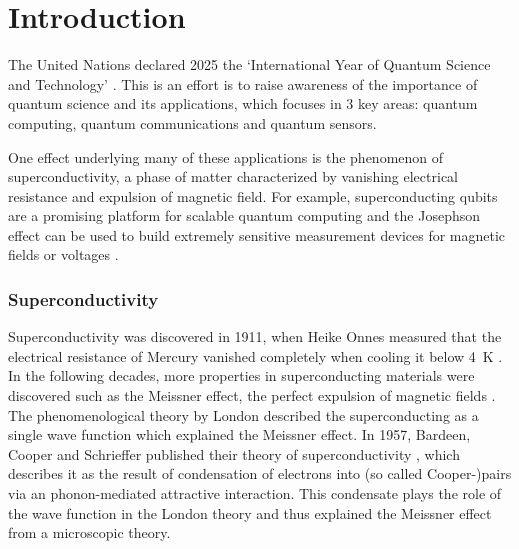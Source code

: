 \documentclass[../notes.tex]{subfiles}
\begin{document}
	
\chapter{Introduction}

The United Nations declared 2025 the `International Year of Quantum Science and Technology' \cite{unitednationsInternationalYearQuantum2024}.
This is an effort is to raise awareness of the importance of quantum science and its applications, which focuses in 3 key areas: quantum computing, quantum communications and quantum sensors.

One effect underlying many of these applications is the phenomenon of superconductivity, a phase of matter characterized by vanishing electrical resistance and expulsion of magnetic field.
For example, superconducting qubits are a promising platform for scalable quantum computing \cite{huangSuperconductingQuantumComputing2020, aruteQuantumSupremacyUsing2019} and the Josephson effect \cite{josephsonPossibleNewEffects1962} can be used to build extremely sensitive measurement devices for magnetic fields \cite{faleyHighTcSQUIDBiomagnetometers2017} or voltages \cite{klushinPresentFutureHightemperature2020}.

\subsection*{Superconductivity}

Superconductivity was discovered in 1911, when Heike Onnes measured that the electrical resistance of Mercury vanished completely when cooling it below \qty{4}{\kelvin} \cite{onnesFurtherExperimentsLiquid1991}.
In the following decades, more properties in superconducting materials were discovered such as the Meissner effect, the perfect expulsion of magnetic fields \cite{meissnerNeuerEffektBei1933}.
The phenomenological theory by London described the superconducting as a single wave function \cite{londonNewConceptionSupraconductivity1937} which explained the Meissner effect.
In 1957, Bardeen, Cooper and Schrieffer published their theory of superconductivity \cite{bardeenTheorySuperconductivity1957}, which describes it as the result of condensation of electrons into (so called Cooper-)pairs via an phonon-mediated attractive interaction.
This condensate plays the role of the wave function in the London theory and thus explained the Meissner effect from a microscopic theory.
\end{document}

